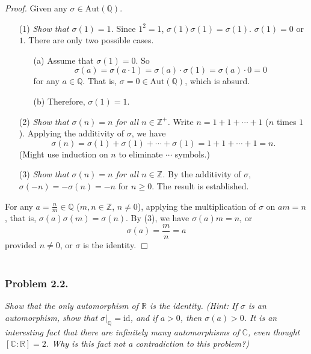 \documentclass{article}
\begin{document}
\emph{Proof.}
Given any $\sigma \in \text{Aut}(\mathbb{Q})$.
\begin{enumerate}
\item[(1)]
\emph{Show that $\sigma(1) = 1$.}
Since $1^2 = 1$, $\sigma(1)\sigma(1) = \sigma(1)$. $\sigma(1) = 0$ or $1$.
There are only two possible cases.
  \begin{enumerate}
  \item[(a)]
  Assume that $\sigma(1) = 0$. So
  $$\sigma(a) = \sigma(a \cdot 1) = \sigma(a)\cdot \sigma(1) = \sigma(a) \cdot 0 = 0$$
  for any $a \in \mathbb{Q}$.
  That is, $\sigma = 0 \in \text{Aut}(\mathbb{Q})$, which is absurd.
  \item[(b)]
  Therefore, $\sigma(1) = 1$.
  \end{enumerate}
\item[(2)]
\emph{Show that $\sigma(n) = n$ for all $n \in \mathbb{Z}^+$.}
Write $n = 1 + 1 + \cdots + 1$ ($n$ times $1$).
Applying the additivity of $\sigma$, we have
$$\sigma(n) = \sigma(1) + \sigma(1) + \cdots + \sigma(1) = 1 + 1 + \cdots + 1 = n.$$
(Might use induction on $n$ to eliminate $\cdots$ symbols.)
\item[(3)]
\emph{Show that $\sigma(n) = n$ for all $n \in \mathbb{Z}$.}
By the additivity of $\sigma$, $\sigma(-n) = -\sigma(n) = -n$ for $n \geq 0$.
The result is established.
\end{enumerate}
For any $a = \frac{n}{m} \in \mathbb{Q}$ ($m, n \in \mathbb{Z}$, $n \neq 0$),
applying the multiplication of $\sigma$ on $am = n$,
that is,
$\sigma(a) \sigma(m) = \sigma(n)$. By (3), we have $\sigma(a)m = n$,
or $$\sigma(a) = \frac{m}{n} = a$$
provided $n \neq 0$,
or $\sigma$ is the identity.
$\Box$ \\\\






\subsubsection*{Problem 2.2.}
\emph{Show that the only automorphism of $\mathbb{R}$ is the identity.
(Hint: If $\sigma$ is an automorphism, show that $\sigma|_{\mathbb{Q}} = \text{id}$,
and if $a > 0$, then $\sigma(a) > 0$.
It is an interesting fact that there are infinitely many automorphisms of $\mathbb{C}$,
even thought $[\mathbb{C}:\mathbb{R}] = 2$.
Why is this fact not a contradiction to this problem?)} \\
\end{document}
